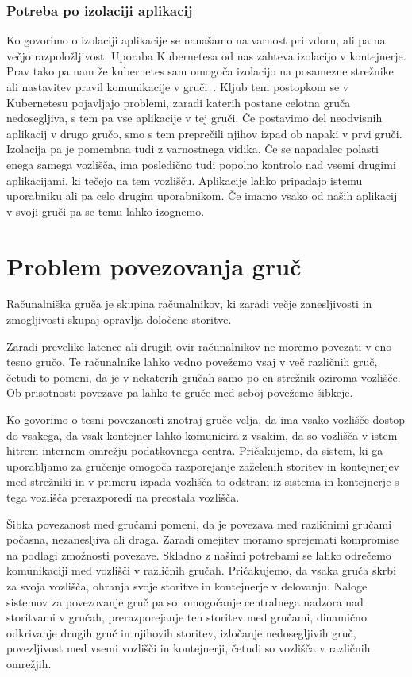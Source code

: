 \documentclass[a4paper, 12pt]{book}
\begin{document}
\subsection{Potreba po izolaciji aplikacij}
Ko govorimo o izolaciji aplikacije se nanašamo na varnost pri vdoru, ali pa na večjo razpoložljivost.
Uporaba Kubernetesa od nas zahteva izolacijo v kontejnerje.
Prav tako pa nam že kubernetes sam omogoča izolacijo na posamezne strežnike~\cite{kube-network-policy} ali nastavitev pravil komunikacije v gruči~\cite{kube-pod-to-node}.
Kljub tem postopkom se v Kubernetesu pojavljajo problemi, zaradi katerih postane celotna gruča nedosegljiva, s tem pa vse aplikacije v tej gruči.
Če postavimo del neodvisnih aplikacij v drugo gručo, smo s tem preprečili njihov izpad ob napaki v prvi gruči.
Izolacija pa je pomembna tudi z varnostnega vidika.
Če se napadalec polasti enega samega vozlišča, ima posledično tudi popolno kontrolo nad vsemi drugimi aplikacijami, ki tečejo na tem vozlišču.
Aplikacije lahko pripadajo istemu uporabniku ali pa celo drugim uporabnikom.
Če imamo vsako od naših aplikacij v svoji gruči pa se temu lahko izognemo.
\chapter{Problem povezovanja gruč}
Računalniška gruča je skupina računalnikov, ki zaradi večje zanesljivosti in zmogljivosti skupaj opravlja določene storitve.

Zaradi prevelike latence ali drugih ovir računalnikov ne moremo povezati v eno tesno gručo.
Te računalnike lahko vedno povežemo vsaj v več različnih gruč, četudi to pomeni, da je v nekaterih gručah samo po en strežnik oziroma vozlišče.
Ob prisotnosti povezave pa lahko te gruče med seboj povežeme šibkeje.

Ko govorimo o tesni povezanosti znotraj gruče velja, da ima vsako vozlišče dostop do vsakega, da vsak kontejner lahko komunicira z vsakim, da so vozlišča v istem hitrem internem omrežju podatkovnega centra. 
Pričakujemo, da sistem, ki ga uporabljamo za gručenje omogoča razporejanje zaželenih storitev in kontejnerjev med strežniki in v primeru izpada vozlišča to odstrani iz sistema in kontejnerje s tega vozlišča prerazporedi na preostala vozlišča.

Šibka povezanost med gručami pomeni, da je povezava med različnimi gručami počasna, nezanesljiva ali draga.
Zaradi omejitev moramo sprejemati kompromise na podlagi zmožnosti povezave.
Skladno z našimi potrebami se lahko odrečemo komunikaciji med vozlišči v različnih gručah.
Pričakujemo, da vsaka gruča skrbi za svoja vozlišča, ohranja svoje storitve in kontejnerje v delovanju.
Naloge sistemov za povezovanje gruč pa so: omogočanje centralnega nadzora nad storitvami v gručah, prerazporejanje teh storitev med gručami, dinamično odkrivanje drugih gruč in njihovih storitev, izločanje nedosegljivih gruč, povezljivost med vsemi vozlišči in kontejnerji, četudi so vozlišča v različnih omrežjih.
\end{document}
